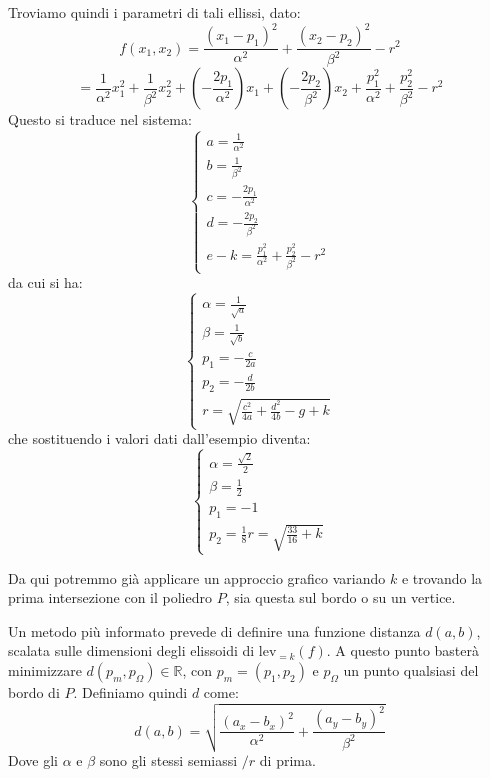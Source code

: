 \documentclass[a4paper,11pt]{article}
\begin{document}
\begin{itemize}
\begin{enumerate}
				Troviamo quindi i parametri di tali ellissi, dato:
				$$
				f(x_1, x_2)	= \frac{(x_1 - p_1)^2}{\alpha^2} + \frac{(x_2 - p_2)^2}{\beta^2} - r^2
				$$
				$$
				= \frac{1}{\alpha^2} x_1^2 + \frac{1}{\beta^2} x_2^2 + \left( -\frac{2 p_1}{\alpha^2} \right) x_1 + \left( -\frac{2 p_2}{\beta^2} \right) x_2 + \frac{p_1^2}{\alpha^2} + \frac{p_2^2}{\beta^2} - r^2
				$$
				Questo si traduce nel sistema:
				\[
					\begin{cases}
						a = \frac{1}{\alpha^2} \\ 	
						b = \frac{1}{\beta^2} \\ 	
						c = - \frac{2 p_1}{\alpha^2} \\ 	
						d = - \frac{2 p_2}{\beta^2} \\ 
						e - k = \frac{p_1^2}{\alpha^2} + \frac{p_2^2}{\beta^2} - r^2
					\end{cases}
				\]
				da cui si ha:
				\[
					\begin{cases}
						\alpha = \frac{1}{\sqrt{a}} \\ 	
						\beta = \frac{1}{\sqrt{b}} \\
						p_1 = - \frac{c}{2a} \\
						p_2 = - \frac{d}{2b} \\
						r = \sqrt{\frac{c^{2}}{4a}+\frac{d^{2}}{4b}-g+k}
					\end{cases}
				\]
				che sostituendo i valori dati dall'esempio diventa:
				\[
					\begin{cases}
						\alpha = \frac{\sqrt{2}}{2} \\ 
						\beta = \frac{1}{2} \\ 
						p_1 = -1 \\ 
						p_2 = \frac{1}{8}
						r = \sqrt{\frac{33}{16} + k}
					\end{cases}
				\]
				
				Da qui potremmo già applicare un approccio grafico variando $k$ e trovando la prima intersezione con il poliedro $P$, sia questa sul bordo o su un vertice.
				
				Un metodo più informato prevede di definire una funzione distanza $d(a, b)$, scalata sulle dimensioni degli elissoidi di $\mathrm{lev}_{=k}(f)$.
				A questo punto basterà minimizzare $d(p_m, p_\Omega) \in \mathbb{R}$, con $p_m = (p_1, p_2)$ e $p_\Omega$ un punto qualsiasi del bordo di $P$.
				Definiamo quindi $d$ come:
				$$
				d(a, b) = \sqrt{\frac{(a_x - b_x)^2}{\alpha^2} + \frac{(a_y - b_y)^2}{\beta^2}}
				$$
				Dove gli $\alpha$ e $\beta$ sono gli stessi semiassi $/ r$ di prima.
				

\end{enumerate}
\end{itemize}
\end{document}
